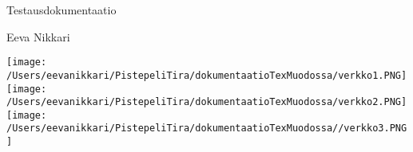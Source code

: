 \documentclass[12pt,a4paper,leqno]{amsart}
\begin{document}
\begin{flushleft}
				Testausdokumentaatio
				\end{flushleft}				\begin{flushright}
				Eeva Nikkari
				\end{flushright}

\texttt{[image: /Users/eevanikkari/PistepeliTira/dokumentaatioTexMuodossa/verkko1.PNG]}\\
\texttt{[image: /Users/eevanikkari/PistepeliTira/dokumentaatioTexMuodossa/verkko2.PNG]}\\
\texttt{[image: /Users/eevanikkari/PistepeliTira/dokumentaatioTexMuodossa//verkko3.PNG]}\\
\end{document}
